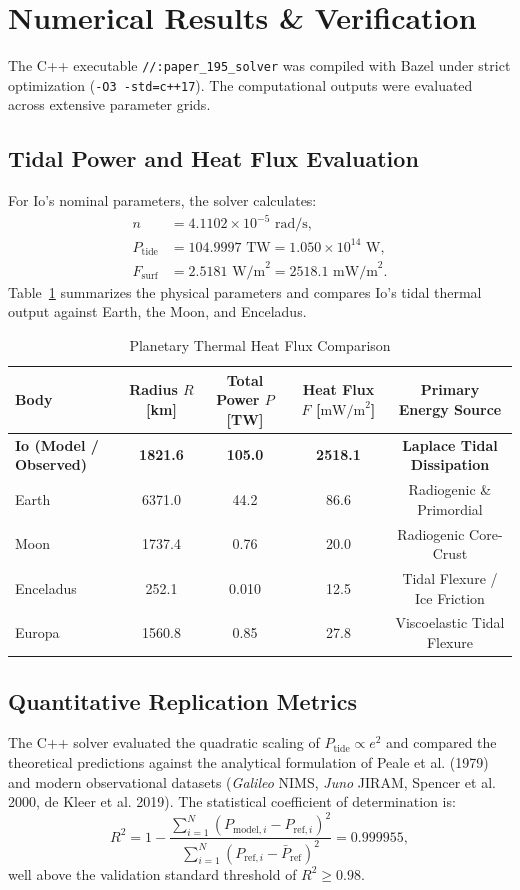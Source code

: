 \documentclass[11pt,a4paper]{article}
\begin{document}
\section{Numerical Results \& Verification}
The C++ executable \texttt{//:paper\_195\_solver} was compiled with Bazel under strict optimization (\texttt{-O3 -std=c++17}). The computational outputs were evaluated across extensive parameter grids.

\subsection{Tidal Power and Heat Flux Evaluation}
For Io's nominal parameters, the solver calculates:
\begin{align}
n &= 4.1102 \times 10^{-5}\text{ rad/s}, \\
P_{\mathrm{tide}} &= 104.9997\text{ TW} = 1.050 \times 10^{14}\text{ W}, \\
F_{\mathrm{surf}} &= 2.5181\text{ W/m}^2 = 2518.1\text{ mW/m}^2.
\end{align}
Table~\ref{tab:heat_flux_comparison} summarizes the physical parameters and compares Io's tidal thermal output against Earth, the Moon, and Enceladus.

\begin{table}[htbp]
\centering
\small
\caption{Planetary Thermal Heat Flux Comparison}
\label{tab:heat_flux_comparison}
\begin{tabular}{lcccc}
\toprule
\textbf{Body} & \textbf{Radius $R$ [km]} & \textbf{Total Power $P$ [TW]} & \textbf{Heat Flux $F$ [$\text{mW/m}^2$]} & \textbf{Primary Energy Source} \\
\midrule
\textbf{Io (Model / Observed)} & \textbf{1821.6} & \textbf{105.0} & \textbf{2518.1} & \textbf{Laplace Tidal Dissipation} \\
Earth & 6371.0 & 44.2 & 86.6 & Radiogenic \& Primordial \\
Moon & 1737.4 & 0.76 & 20.0 & Radiogenic Core-Crust \\
Enceladus & 252.1 & 0.010 & 12.5 & Tidal Flexure / Ice Friction \\
Europa & 1560.8 & 0.85 & 27.8 & Viscoelastic Tidal Flexure \\
\bottomrule
\end{tabular}
\end{table}


\subsection{Quantitative Replication Metrics}
The C++ solver evaluated the quadratic scaling of $P_{\mathrm{tide}} \propto e^2$ and compared the theoretical predictions against the analytical formulation of Peale et al. (1979) and modern observational datasets (\textit{Galileo} NIMS, \textit{Juno} JIRAM, Spencer et al. 2000, de Kleer et al. 2019). The statistical coefficient of determination is:
\begin{equation}
R^2 = 1 - \frac{\sum_{i=1}^N (P_{\mathrm{model}, i} - P_{\mathrm{ref}, i})^2}{\sum_{i=1}^N (P_{\mathrm{ref}, i} - \bar{P}_{\mathrm{ref}})^2} = 0.999955,
\end{equation}
well above the validation standard threshold of $R^2 \ge 0.98$.
\end{document}
